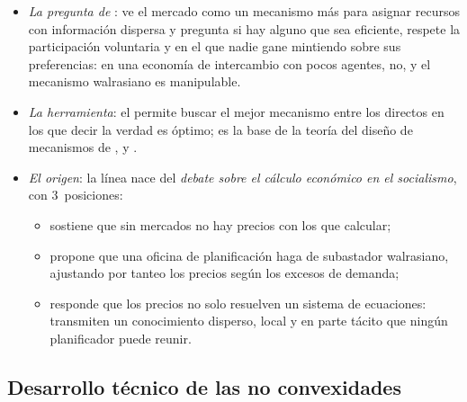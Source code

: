 \documentclass[11pt]{article}
\begin{document}
\begin{itemize}
\item \emph{La pregunta de }: \textcite{Hurwicz1972Informationally} ve el mercado como un mecanismo más para asignar recursos con información dispersa y pregunta si hay alguno que sea eficiente, respete la participación voluntaria y en el que nadie gane mintiendo sobre sus preferencias: en una economía de intercambio con pocos agentes, no, y el mecanismo walrasiano es manipulable.
\item \emph{La herramienta}: el \nocite{Gibbard1973Manipulation,DasguptaHammondMaskin1979Implementation,Myerson1979Incentive} permite buscar el mejor mecanismo entre los directos en los que decir la verdad es óptimo; es la base de la teoría del diseño de mecanismos de ,  y   .
\item \emph{El origen}: la línea nace del \emph{debate sobre el cálculo económico en el socialismo}, con 3~posiciones:
  \begin{itemize}
  \item \textcite{Mises1920Wirtschaftsrechnung} sostiene que sin mercados no hay precios con los que calcular;
  \item \textcite{Lange1936Socialism} propone que una oficina de planificación haga de subastador walrasiano, ajustando por tanteo los precios según los excesos de demanda;
  \item \textcite{Hayek1945Use} responde que los precios no solo resuelven un sistema de ecuaciones: transmiten un conocimiento disperso, local y en parte tácito que ningún planificador puede reunir.
  \end{itemize}
\end{itemize}

\subsection{Desarrollo técnico de las no convexidades}\label{anexo:no-convexidades}
\end{document}
